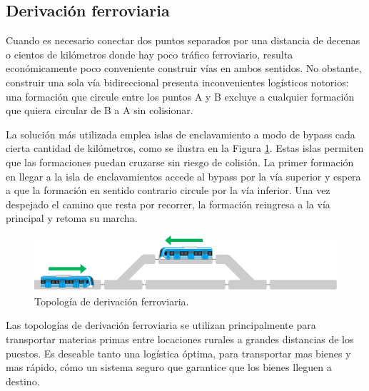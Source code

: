 \subsection{Derivación ferroviaria}

Cuando es necesario conectar dos puntos separados por una distancia de decenas o cientos de kilómetros donde hay poco tráfico ferroviario, resulta económicamente poco conveniente construir vías en ambos sentidos. No obstante, construir una sola vía bidireccional presenta inconvenientes logísticos notorios: una formación que circule entre los puntos A y B excluye a cualquier formación que quiera circular de B a A sin colisionar. %

La solución más utilizada emplea islas de enclavamiento a modo de bypass cada cierta cantidad de kilómetros, como se ilustra en la Figura \ref{fig:bypass_1}. Estas islas permiten que las formaciones puedan cruzarse sin riesgo de colisión. La primer formación en llegar a la isla de enclavamientos accede al bypass por la vía superior y espera a que la formación en sentido contrario circule por la vía inferior. Una vez despejado el camino que resta por recorrer, la formación reingresa a la vía principal y retoma su marcha.

    \begin{figure}[H]
        \centering
        \includegraphics[width=1\textwidth]{Figuras/bypass}
        \centering\caption{Topología de derivación ferroviaria.}
        \label{fig:bypass_1}
    \end{figure}
    
Las topologías de derivación ferroviaria se utilizan principalmente para transportar materias primas entre locaciones rurales a grandes distancias de los puestos. Es deseable tanto una logística óptima, para transportar mas bienes y mas rápido, cómo un sistema seguro que garantice que los bienes lleguen a destino.